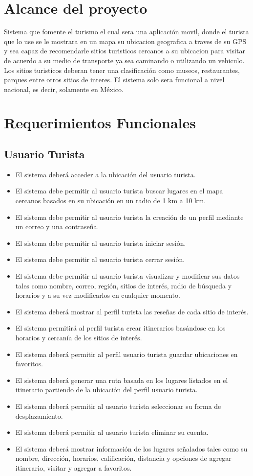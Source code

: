 \documentclass{article}
\begin{document}
\section{Alcance del proyecto}
\justifying
Sistema que fomente el turismo el cual sera una aplicación movil, donde el turista que lo use se le mostrara en un mapa su ubicacion geografica a traves de su GPS y sea capaz de recomendarle sitios turisticos cercanos a su ubicacion para visitar de acuerdo a su medio de transporte ya sea caminando o utilizando un vehiculo. Los sitios turisticos deberan tener una clasificación como museos, restaurantes, parques entre otros sitios de interes. El sistema solo sera funcional a nivel nacional, es decir, solamente en México.

\section{Requerimientos Funcionales}
\subsection{Usuario Turista}
\begin{itemize}
    \item El sistema deberá acceder a la ubicación del usuario turista.
    \item El sistema debe permitir al usuario turista buscar lugares  en el mapa cercanos basados en su ubicación en un radio de 1 km a 10 km.
    \item El sistema debe permitir al usuario turista la creación de un perfil mediante un correo y una contraseña.
    \item El sistema debe permitir al usuario turista iniciar sesión.
    \item El sistema debe permitir al usuario turista cerrar sesión.
    \item El sistema debe permitir al usuario turista visualizar y modificar sus datos tales como nombre, correo, región, sitios de interés, radio de búsqueda y horarios y a su vez modificarlos en cualquier momento.
    \item El sistema deberá mostrar al perfil turista las reseñas de cada sitio de interés.
    \item El sistema permitirá al perfil turista crear itinerarios basándose en los horarios y cercanía de los sitios de interés.
    \item El sistema deberá permitir al perfil usuario turista guardar ubicaciones en favoritos.
    \item El sistema deberá generar una ruta basada en los lugares listados en el itinerario partiendo de la ubicación del perfil usuario turista.
    \item El sistema deberá permitir al usuario turista seleccionar su forma de desplazamiento.
    \item El sistema deberá permitir al usuario turista eliminar su cuenta.
    \item El sistema deberá mostrar información de los lugares señalados tales como su nombre, dirección, horarios, calificación, distancia y opciones de agregar itinerario, visitar y agregar a favoritos.
\end{itemize}
\end{document}
